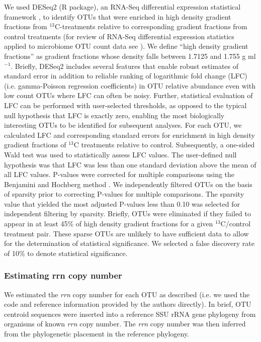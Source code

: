 \documentclass{article}
\begin{document}
We used DESeq2 (R package), an RNA-Seq differential expression statistical
framework \citep{love2014}, to identify OTUs that were enriched in high density
gradient fractions from $^{13}$C-treatments relative to corresponding gradient
fractions from control treatments (for review of RNA-Seq differential
expression statistics applied to microbiome OTU count data see
\citep{McMurdie2014}). We define ``high density gradient fractions'' as gradient
fractions whose density falls between 1.7125 and 1.755 g ml$^{-1}$.
Briefly, DESeq2 includes several features that enable robust estimates of standard error
in addition to reliable ranking of logarithmic fold change (LFC) (i.e.
gamma-Poisson regression coefficients) in OTU relative abundance even with low
count OTUs where LFC can often be noisy. Further, statistical evaluation of LFC
can be performed with user-selected thresholds, as opposed to the typical null
hypothesis that LFC is exactly zero, enabling the most biologically interesting
OTUs to be identified for subsequent analyses. For each OTU, we calculated LFC
and corresponding standard errors for enrichment in high density gradient
fractions of $^{13}$C treatments relative to control. Subsequently, a one-sided
Wald test was used to statistically assess LFC values. The user-defined null
hypothesis was that LFC was less than one standard deviation above the mean of
all LFC values. P-values were corrected for multiple comparisons using the
Benjamini and Hochberg method \citep{benjamini1995}. We independently filtered
OTUs on the basis of sparsity prior to correcting P-values for multiple
comparisons. The sparsity value that yielded the most adjusted P-values less
than 0.10 was selected for independent filtering by sparsity. Briefly, OTUs
were eliminated if they failed to appear in at least 45\% of high density
gradient fractions for a given $^{13}$C/control treatment pair. These sparse
OTUs are unlikely to have sufficient data to allow for the determination of
statistical significance. We selected a false discovery rate of 10\% to denote
statistical significance.

\subsubsection{Estimating rrn copy number}
We estimated the \textit{rrn} copy number for each OTU as described
\citep{Kembel_2012} (i.e. we used the code and reference information provided
by the authors \citep{Kembel_2012} directly). In brief, OTU centroid sequences
were inserted into a reference SSU rRNA gene phylogeny \citep{matsen2010} from
organisms of known \textit{rrn} copy number. The \textit{rrn} copy number was
then inferred from the phylogenetic placement in the reference phylogeny. 
\end{document}
